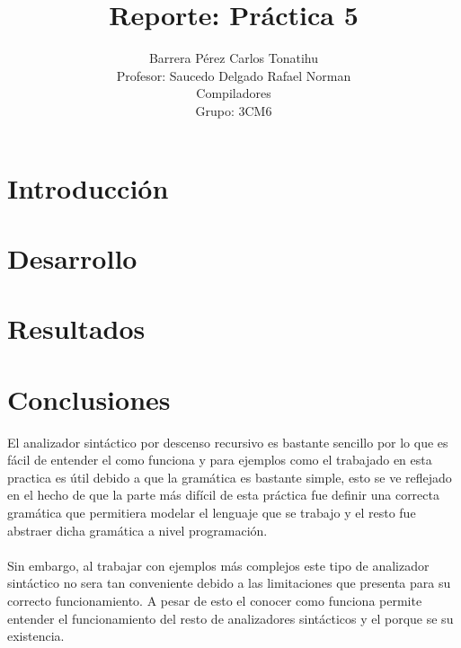 \documentclass[12pt, titlepage]{article}
\title{Reporte: Práctica 5}
\author{Barrera Pérez Carlos Tonatihu \\ Profesor: Saucedo Delgado Rafael Norman 
\\ Compiladores \\ Grupo: 3CM6}
\begin{document}
\maketitle
\tableofcontents
\newpage
\section{Introducción}
\section{Desarrollo}
\section{Resultados}
\newpage
\section{Conclusiones}
El analizador sintáctico por descenso recursivo es bastante sencillo por lo que 
es fácil de entender el como funciona y para ejemplos como el trabajado en esta 
practica es útil debido a que la gramática es bastante simple, esto se ve 
reflejado en el hecho de que la parte más difícil de esta práctica fue definir 
una correcta gramática que permitiera modelar el lenguaje que se trabajo y el 
resto fue abstraer dicha gramática a nivel programación.
\\\\
Sin embargo, al trabajar con ejemplos más complejos este tipo de analizador 
sintáctico no sera tan conveniente debido a las limitaciones que presenta para 
su correcto funcionamiento.
A pesar de esto el conocer como funciona permite entender el funcionamiento del 
resto de analizadores sintácticos y el porque se su existencia.
 

\end{document}
